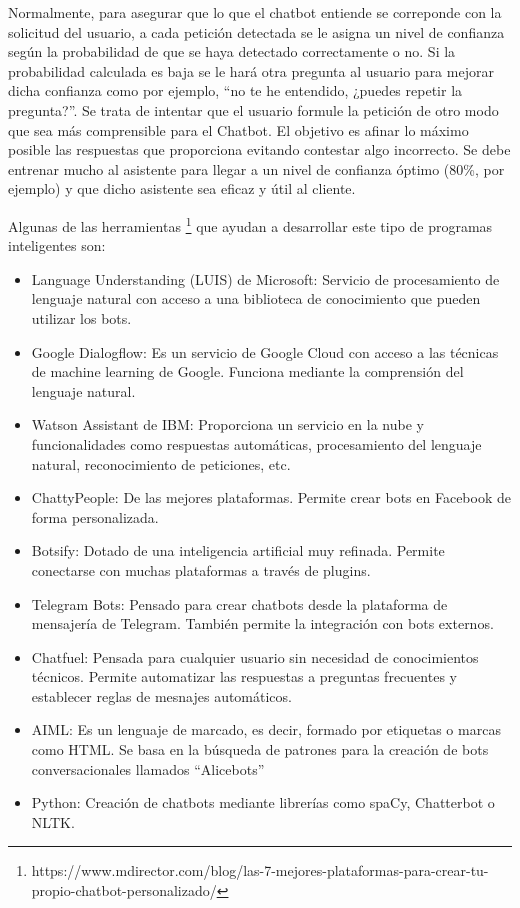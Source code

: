 Normalmente, para asegurar que lo que el chatbot entiende se correponde con la solicitud del usuario, a cada petición detectada se le asigna un nivel de confianza según la probabilidad de que se haya detectado correctamente o no. Si la probabilidad calculada es baja se le hará otra pregunta al usuario para mejorar dicha confianza como por ejemplo, ``no te he entendido, ¿puedes repetir la pregunta?''. Se trata de intentar que el usuario formule la petición de otro modo que sea más comprensible para el Chatbot. El objetivo es afinar lo máximo posible las respuestas que proporciona evitando contestar algo incorrecto. Se debe entrenar mucho al asistente para llegar a un nivel de confianza óptimo (80\%, por ejemplo) y que dicho asistente sea eficaz y útil al cliente.

Algunas de las herramientas \footnote{https://www.mdirector.com/blog/las-7-mejores-plataformas-para-crear-tu-propio-chatbot-personalizado/} que ayudan a desarrollar este tipo de programas inteligentes son:

\begin{itemize}
	\item Language Understanding (LUIS) de Microsoft: Servicio de procesamiento de lenguaje natural con acceso a una biblioteca de conocimiento que pueden utilizar los bots.
	\item Google Dialogflow: Es un servicio de Google Cloud con acceso a las técnicas de machine learning de Google. Funciona mediante la comprensión del lenguaje natural.
	\item Watson Assistant de IBM: Proporciona un servicio en la nube y funcionalidades como respuestas automáticas, procesamiento del lenguaje natural, reconocimiento de peticiones, etc.
	\item ChattyPeople: De las mejores plataformas. Permite crear bots en Facebook de forma personalizada.
	\item Botsify: Dotado de una inteligencia artificial muy refinada. Permite conectarse con muchas plataformas a través de plugins. 
	\item Telegram Bots: Pensado para crear chatbots desde la plataforma de mensajería de Telegram. También permite la integración con bots externos.
	\item Chatfuel: Pensada para cualquier usuario sin necesidad de conocimientos técnicos. Permite automatizar las respuestas a preguntas frecuentes y establecer reglas de mesnajes automáticos.
	\item AIML: Es un lenguaje de marcado, es decir, formado por etiquetas o marcas como HTML. Se basa en la búsqueda de patrones para la creación de bots conversacionales llamados ``Alicebots''
	\item Python: Creación de chatbots mediante librerías como spaCy, Chatterbot o NLTK.
\end{itemize} 

